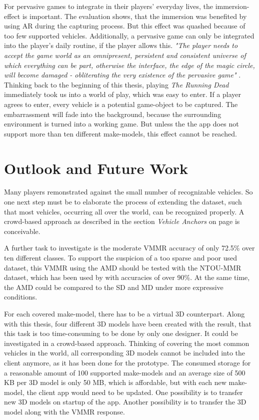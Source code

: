 For pervasive games to integrate in their players' everyday lives, the immersion-effect is important. The evaluation shows, that the immersion was benefited by using AR during the capturing process. But this effect was quashed because of too few supported vehicles. Additionally, a pervasive game can only be integrated into the player's daily routine, if the player allows this. \emph{"The player needs to accept the game world as an omnipresent, persistent and consistent universe of which everything can be part, otherwise the interface, the edge of the magic circle, will become damaged - obliterating the very existence of the pervasive game"} \citep{nieuwdorp2009pervasive}. Thinking back to the beginning of this thesis, playing \emph{The Running Dead} immediately took us into a world of play, which was easy to enter. If a player agrees to enter, every vehicle is a potential game-object to be captured. The embarrassment will fade into the background, because the surrounding environment is turned into a working game. But unless the the app does not support more than ten different make-models, this effect cannot be reached.

\section{Outlook and Future Work}
Many players remonstrated against the small number of recognizable vehicles. So one next step must be to elaborate the process of extending the dataset, such that most vehicles, occurring all over the world, can be recognized properly. A crowd-based approach as described in the section \emph{Vehicle Anchors} on page \pageref{par:vehicleAnchors} is conceivable.
 
A further task to investigate is the moderate VMMR accuracy of only 72.5\% over ten different classes. To support the suspicion of a too sparse and poor used dataset, this VMMR using the AMD should be tested with the NTOU-MMR dataset, which has been used by \citep{siddiqui2015robust} with accuracies of over 90\%. At the same time, the AMD could be compared to the SD and MD under more expressive conditions.
 
For each covered make-model, there has to be a virtual 3D counterpart. Along with this thesis, four different 3D models have been created with the result, that this task is too time-consuming to be done by only one designer. It could be investigated in a crowd-based approach. Thinking of covering the most common vehicles in the world, all corresponding 3D models cannot be included into the client anymore, as it has been done for the prototype. The consumed storage for a reasonable amount of 100 supported make-models and an average size of 500 KB per 3D model is only 50 MB, which is affordable, but with each new make-model, the client app would need to be updated. One possibility is to transfer new 3D models on startup of the app. Another possibility is to transfer the 3D model along with the VMMR response.
 
